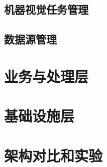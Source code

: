 \subsection{机器视觉任务管理}
\subsection{数据源管理}


\section{业务与处理层}
\label{sec:arch_workers}

\section{基础设施层}
\label{sec:arch_infra}


\section{架构对比和实验}
\label{sec:arch_experiment}
